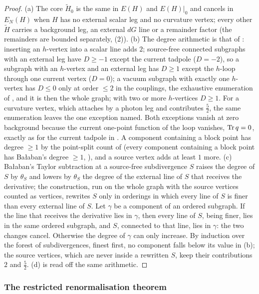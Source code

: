 \begin{proof}
(a) The core $\tilde H_0$ is the same in $E(H)$ and $E(H)|_0$ and cancels in $E_N(H)$ when $H$ has no external scalar leg and no curvature vertex; every other $\tilde H$ carries a background leg, an external $dG$ line or a remainder factor (the remainders are bounded separately, (2)). (b) The degree arithmetic is that of : inserting an $h$-vertex into a scalar line adds $2$; source-free connected subgraphs with an external leg have $D\ge-1$ except the current tadpole ($D=-2$), so a subgraph with an $h$-vertex and an external leg has $D\ge1$ except the $h$-loop through one current vertex ($D=0$); a vacuum subgraph with exactly one $h$-vertex has $D\le0$ only at order $\le2$ in the couplings, the exhaustive enumeration of , and it is then the whole graph; with two or more $h$-vertices $D\ge1$. For a curvature vertex, which attaches by a photon leg and contributes $\frac52$, the same enumeration leaves the one exception named. Both exceptions vanish at zero background because the current one-point function of the loop vanishes, $\operatorname{Tr} q=0$, exactly as for the current tadpole in . A component containing a block point has degree $\ge1$ by the point-split count of  (every component containing a block point has Ba{\l}aban's degree $\ge1$, \cite[(2.1)--(2.2)]{Ba3}), and a source vertex adds at least $1$ more. (c) Ba{\l}aban's Taylor subtraction at a source-free subdivergence $S$ raises the degree of $S$ by $\theta_S$ and lowers by $\theta_S$ the degree of the external line of $S$ that receives the derivative; the construction, run on the whole graph with the source vertices counted as vertices, rewrites $S$ only in orderings in which every line of $S$ is finer than every external line of $S$. Let $\gamma$ be a component of an ordered subgraph. If the line that receives the derivative lies in $\gamma$, then every line of $S$, being finer, lies in the same ordered subgraph, and $S$, connected to that line, lies in $\gamma$: the two changes cancel. Otherwise the degree of $\gamma$ can only increase. By induction over the forest of subdivergences, finest first, no component falls below its value in (b); the source vertices, which are never inside a rewritten $S$, keep their contributions $2$ and $\frac52$. (d) is read off the same arithmetic.
\end{proof}

\subsubsection*{The restricted renormalisation theorem}

